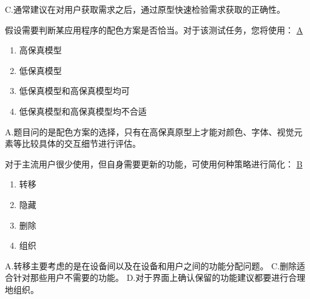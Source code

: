 \begin{solution}
C.通常建议在对用户获取需求之后，通过原型快速检验需求获取的正确性。
\end{solution}


\begin{problem}
	假设需要判断某应用程序的配色方案是否恰当。对于该测试任务，您将使用：
	\uline{A}    
    \vspace{-0.8em}
    \begin{multicols}{2}
        \begin{enumerate}[label=\Alph*.]
            \item 高保真模型
            \item 低保真模型
            \item 低保真模型和高保真模型均可
            \item 低保真模型和高保真模型均不合适
        \end{enumerate}
    \end{multicols}
    \vspace{-1em}
\end{problem}

\begin{solution}
A.题目问的是配色方案的选择，只有在高保真原型上才能对颜色、字体、视觉元素等比较具体的交互细节进行评估。
\end{solution}


\begin{problem}
	‍对于主流用户很少使用，但自身需要更新的功能，可使用何种策略进行简化：
	\uline{B}    
    \vspace{-0.8em}
    \begin{multicols}{4}
        \begin{enumerate}[label=\Alph*.]
            \item 转移
            \item 隐藏
            \item 删除
            \item 组织
        \end{enumerate}
    \end{multicols}
    \vspace{-1em}
\end{problem}

\begin{solution}
A.转移主要考虑的是在设备间以及在设备和用户之间的功能分配问题。  C.删除适合针对那些用户不需要的功能。  D.对于界面上确认保留的功能建议都要进行合理地组织。
\end{solution}


